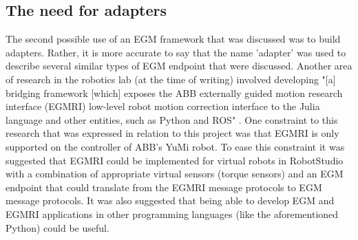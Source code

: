 \documentclass{cslthse-msc}
\begin{document}
\subsection{The need for adapters}
\label{sec:Dev:I2:adapters}
The second possible use of an EGM framework that was discussed was to build adapters. Rather, it is more accurate to say that the name 'adapter' was used to describe several similar types of EGM endpoint that were discussed. Another area of research in the robotics lab (at the time of writing) involved developing "[a] bridging framework [which] exposes the ABB externally guided motion research interface (EGMRI) low-level robot motion correction interface to the Julia language and other entities, such as Python and ROS" \cite{LU:egmri}. One constraint to this research that was expressed in relation to this project was that EGMRI is only supported on the controller of ABB's YuMi robot. To ease this constraint it was suggested that EGMRI could be implemented for virtual robots in RobotStudio with a combination of appropriate virtual sensors (torque sensors) and an EGM endpoint that could translate from the EGMRI message protocols to EGM message protocols. It was also suggested that being able to develop EGM and EGMRI applications in other programming languages (like the aforementioned Python) could be useful.  
\end{document}
